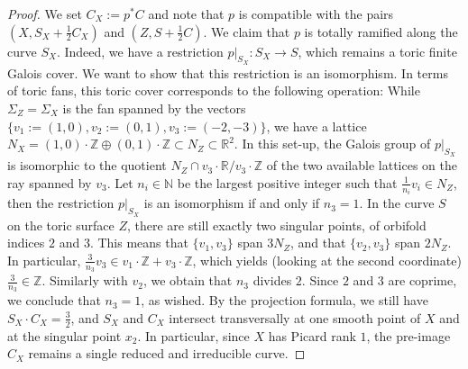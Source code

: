\documentclass{amsart}
\newcommand{\zz}{\mathbb{Z}}
\newcommand{\nn}{\mathbb{N}}
\newcommand{\rr}{\mathbb{R}}
\theoremstyle{definition}
\theoremstyle{remark}
\numberwithin{equation}{section}
\begin{document}
\begin{proof}
We set $C_X:=p^*C$ and note that $p$ is compatible with the pairs $(X,S_X+\frac{1}{2}C_X)$ and $(Z,S+\frac{1}{2}C)$. We claim that $p$ is totally ramified along the curve $S_X$.
Indeed, we have a restriction $p|_{S_X}:S_X\to S$, which remains a toric finite Galois cover. We want to show that this restriction is an isomorphism. In terms of toric fans, this toric cover corresponds to the following operation: While $\Sigma_Z=\Sigma_X$ is the fan spanned by the vectors $\{v_1:=(1,0),v_2:=(0,1),v_3:=(-2,-3)\}$, we have a lattice $N_X = (1,0)\cdot \zz\oplus (0,1)\cdot \zz\subset N_Z \subset \rr^2$. In this set-up, the Galois group of $p|_{S_X}$ is isomorphic to the quotient 
$N_Z\cap v_3\cdot \rr/v_3\cdot \zz$
of the two available lattices on the ray spanned by $v_3$.
Let $n_i\in\nn$ be the largest positive integer such that $\frac{1}{n_i}v_i\in N_Z$, then the restriction $p|_{S_X}$ is an isomorphism if and only if $n_3=1$. In the curve $S$ on the toric surface $Z$, there are still exactly two singular points, of orbifold indices $2$ and $3$. This means that $\{v_1,v_3\}$ span $3N_Z$, and that $\{v_2,v_3\}$ span $2N_Z$. In particular, $\frac{3}{n_3}v_3 \in v_1\cdot\zz +v_3\cdot\zz$, which yields (looking at the second coordinate) $\frac{3}{n_3}\in\zz$. Similarly with $v_2$, we obtain that $n_3$ divides $2$. Since $2$ and $3$ are coprime, we conclude that $n_3=1$, as wished.
By the projection formula, we still have $S_X\cdot C_X =\frac{3}{2}$, and $S_X$ and $C_X$ intersect transversally at one smooth point of $X$ and at the singular point $x_2$. In particular, since $X$ has Picard rank $1$, the pre-image $C_X$ remains a single reduced and irreducible curve.



\end{proof}
\end{document}
